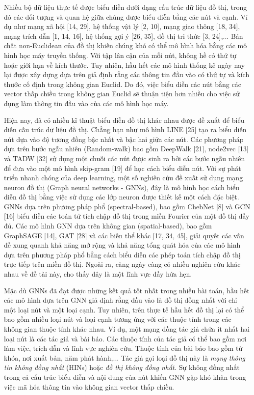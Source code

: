  Nhiều bộ dữ liệu thực tế được biểu diễn dưới dạng cấu trúc dữ liệu đồ thị, trong đó các đối tượng và quan hệ giữa chúng được biểu diễn bằng các nút và cạnh. Ví dụ như mạng xã hội [14, 29], hệ thống vật lý [2, 10], mạng giao thông [18, 34], mạng trích dẫn [1, 14, 16], hệ thống gợi ý [26, 35], đồ thị tri thức [3, 24],... Bản chất non-Euclidean của đồ thị khiến chúng khó có thể mô hình hóa bằng các mô hình học máy truyền thống. Với tập lân cận của mỗi nút, không hề có thứ tự hoặc giới hạn về kích thước. Tuy nhiên, hầu hết các mô hình thống kê ngày nay lại được xây dựng dựa trên giả định rằng các thông tin đầu vào có thứ tự và kích thước cố định trong không gian Euclid. Do đó, việc biểu diễn các nút bằng các vector thấp chiều trong không gian Euclid sẽ thuận tiện hơn nhiều cho việc sử dụng làm thông tin đầu vào của các mô hình học máy. 

 Hiện nay, đã có nhiều kĩ thuật biểu diễn đồ thị khác nhau được đề xuất để biểu diễn cấu trúc dữ liệu đồ thị. Chẳng hạn như mô hình LINE [25] tạo ra biểu diễn nút dựa vào độ tương đồng bậc nhất và bậc hai giữa các nút. Các phương pháp dựa trên bước ngẫu nhiên (Random-walk) bao gồm DeepWalk [21], node2vec [13] và TADW [32] sử dụng một chuỗi các nút được sinh ra bởi các bước ngẫu nhiên để đưa vào một mô hình skip-gram [19] để học cách biểu diễn nút. Với sự phát triển nhanh chóng của deep learning, một số nghiên cứu đề xuất sử dụng mạng neuron đồ thị (Graph neural networks - GNNs), đây là mô hình học cách biểu diễn đồ thị bằng việc sử dụng các lớp neuron được thiết kế một cách đặc biệt. GNNs dựa trên phương pháp phổ (spectral-based), bao gồm ChebNet [8] và GCN [16] biểu diễn các toán tử tích chập đồ thị trong miền Fourier của một đồ thị đầy đủ. Các mô hình GNN dựa trên không gian (spatial-based), bao gồm GraphSAGE [14], GAT [28] và các biến thể khác [17, 34, 45], giải quyết các vấn đề xung quanh khả năng mở rộng và khả năng tổng quát hóa của các mô hình dựa trên phương pháp phổ bằng cách biểu diễn các phép toán tích chập đồ thị trực tiếp trên miền đồ thị. Ngoài ra, càng ngày càng có nhiều nghiên cứu khác nhau về đề tài này, cho thấy đây là một lĩnh vực đầy hứa hẹn.

 Mặc dù GNNs đã đạt được những kết quả tốt nhất trong nhiều bài toán, hầu hết các mô hình dựa trên GNN giả định rằng đầu vào là đồ thị đồng nhất với chỉ một loại nút và một loại cạnh. Tuy nhiên, trên thực tế hầu hết đồ thị lại có thể bao gồm nhiều loại nút và loại cạnh tương ứng với các thuộc tính trong các không gian thuộc tính khác nhau. Ví dụ, một mạng đồng tác giả chứa ít nhất hai loại nút là các tác giả và bài báo. Các thuộc tính của tác giả có thể bao gồm nơi làm việc, trích dẫn và lĩnh vực nghiên cứu. Thuộc tính của bài báo bao gồm từ khóa, nơi xuất bản, năm phát hành,... Tác giả gọi loại đồ thị này là \textit{mạng thông tin không đồng nhất} (HINs) hoặc \textit{đồ thị không đồng nhất.}
 Sự không đồng nhất trong cả cấu trúc biểu diễn và nội dung của nút khiến GNN gặp khó khăn trong việc mã hóa thông tin vào không gian vector thấp chiều. 

